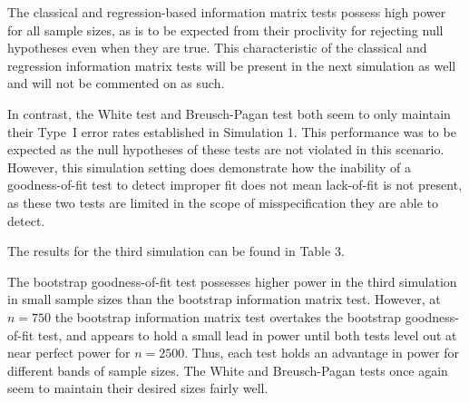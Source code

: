 \documentclass[submit]{smj}
\begin{document}
The classical and regression-based information matrix tests possess high power for all sample sizes, as is to be expected from their proclivity for rejecting null hypotheses even when they are true.
This characteristic of the classical and regression information matrix tests will be present in the next simulation as well and will not be commented on as such. 

In contrast, the White test and Breusch-Pagan test both seem to only maintain their Type~I error rates established in Simulation 1. This performance was to be expected
as the null hypotheses of these tests are not violated in this scenario. However, this simulation setting does demonstrate how the inability of a goodness-of-fit test to detect improper
fit does not mean lack-of-fit is not present, as these two tests are limited in the scope of misspecification they are able to detect.

The results for the third simulation can be found in Table 3.

\begin{table}[H]
	\centering
	\small\addtolength{\tabcolsep}{-3pt}
	\setlength\extrarowheight{-3pt}
	{
	}
	\end{table}

The bootstrap goodness-of-fit test possesses higher power in the third simulation in small sample sizes than the bootstrap information matrix test. However, at $n = 750$ the bootstrap information matrix test
overtakes the bootstrap goodness-of-fit test, and appears to hold a small lead in power until both tests level out at near perfect power for $n = 2500$. Thus, each test holds an advantage in power for different bands of sample sizes.
The White and Breusch-Pagan tests once again seem to maintain their desired sizes fairly well.
\end{document}
